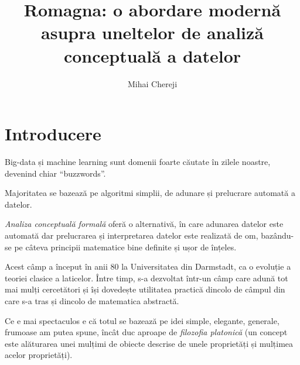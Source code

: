 \documentclass[12pt, a4paper, twoside, romanian]{teza-upb}
\begin{document}
\author{Mihai Chereji}

\title{Romagna: o abordare modernă asupra uneltelor de analiză conceptuală a datelor}




\beforepreface
\listoffigures
\listoftables
{}
\afterpreface 

\chapter*{Introducere}
  Big-data și machine learning sunt domenii foarte căutate în zilele noastre, devenind chiar “buzzwords”. 
  
  Majoritatea se bazează pe algoritmi simplii, de adunare și prelucrare automată a datelor.

  \textit{Analiza conceptuală formală} oferă o alternativă, în care adunarea datelor este automată dar prelucrarea și interpretarea datelor este realizată de om, bazându-se pe câteva principii matematice bine definite și ușor de înțeles. 

  Acest câmp a început în anii 80 la Universitatea din Darmstadt, ca o evoluție a teoriei clasice a laticelor. Între timp, s-a dezvoltat într-un câmp care adună tot mai mulți cercetători și își dovedește utilitatea practică dincolo de câmpul din care s-a tras și dincolo de matematica abstractă.

  Ce e mai spectaculos e că totul se bazează pe idei simple, elegante, generale, frumoase am putea spune, încât duc aproape de \textit{filozofia platonică} (un concept este alăturarea unei mulțimi de obiecte descrise de unele proprietăți și mulțimea acelor proprietăți).
\end{document}
